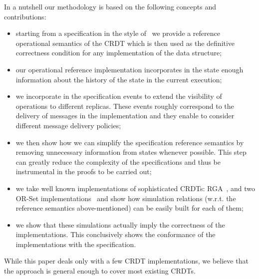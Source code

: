 

In a nutshell our methodology is based on the following concepts and
contributions:
\begin{itemize}[$\bullet$]
\item starting from a specification in the style of~\cite{Burckhardt:2014}
  we provide a reference operational semantics of the CRDT which is
  then used as the definitive correctness condition for any
  implementation of the data structure;
\item our operational reference implementation incorporates in the
  state enough information about the history of the state in the
  current execution;
\item we incorporate in the specification events to extend the
  visibility of operations to different replicas. These events roughly
  correspond to the delivery of messages in the implementation and
  they enable to consider different message delivery policies;
\item we then show how we can simplify the specification reference
  semantics by removing unnecessary information from states whenever
  possible. 
  This step can greatly reduce the complexity of the specifications
  and thus be instrumental in the proofs to be carried out;
\item we take well known implementations of sophisticated CRDTs:
  RGA~\cite{RohJKL11}, and two OR-Set
  implementations~\cite{Shapiro:2011,Bieniusa:2012} and show how
  simulation relations (w.r.t. the reference semantics
  above-mentioned) can be easily built for each of them;
\item we show that these simulations actually imply the correctness of
  the implementations.
  This conclusively shows the conformance of the implementations with
  the specification.
\end{itemize}

While this paper deals only with a few CRDT implementations, we
believe that the approach is general enough to cover most existing
CRDTs.
%

